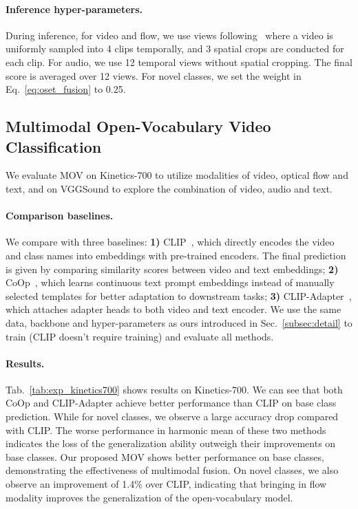 \documentclass{article}
\begin{document}
\paragraph{Inference hyper-parameters.}
During inference, for video and flow, we use  views following~\cite{arnab2021vivit, liu2021video} where a video is uniformly sampled into 4 clips temporally, and 3 spatial crops are conducted for each clip. 
For audio, we use 12 temporal views without spatial cropping. The final score is averaged over 12 views. For novel classes, we set the weight  in Eq.~\ref{eq:oset_fusion} to 0.25. 


\subsection{Multimodal Open-Vocabulary Video Classification} 
We evaluate MOV on Kinetics-700 to utilize modalities of video, optical flow and text, and on VGGSound to explore the combination of video, audio and text. 

\paragraph{Comparison baselines.} We compare with three baselines: \textbf{1)} CLIP~\cite{radford2021learning}, which directly encodes the video and class names into embeddings with pre-trained encoders. The final prediction is given by comparing similarity scores between video and text embeddings; 
\textbf{2)} CoOp~\cite{zhou2021coop}, which learns continuous text prompt embeddings instead of manually selected templates for better adaptation to downstream tasks; 
\textbf{3)} CLIP-Adapter~\cite{gao2021clip}, which attaches adapter heads to both video and text encoder. We use the same data, backbone and hyper-parameters as ours introduced in Sec.~\ref{subsec:detail} to train (CLIP doesn't require training) and evaluate all methods.

\paragraph{Results.} 
Tab.~\ref{tab:exp_kinetics700} shows results on Kinetics-700. 
We can see that both CoOp and CLIP-Adapter achieve better performance than CLIP on base class prediction. While for novel classes, we observe a large accuracy drop compared with CLIP. 
The worse performance in harmonic mean of these two methods indicates the loss of the generalization ability outweigh their improvements on base classes. 
Our proposed MOV shows better performance on base classes, demonstrating the effectiveness of multimodal fusion. On novel classes, we also observe an improvement of 1.4\% over CLIP, indicating that bringing in flow modality improves the generalization of the open-vocabulary model.
\end{document}
